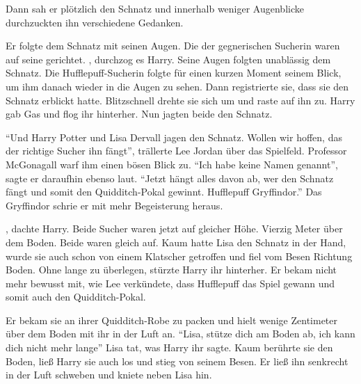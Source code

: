 
Dann sah er plötzlich den Schnatz und innerhalb weniger Augenblicke durchzuckten ihn verschiedene Gedanken. 

Er folgte dem Schnatz mit seinen Augen. Die der gegnerischen Sucherin waren auf seine gerichtet. , durchzog es Harry.  Seine Augen folgten unablässig dem Schnatz. Die Hufflepuff-Sucherin folgte für einen kurzen Moment seinem Blick, um ihm danach wieder in die Augen zu sehen. Dann registrierte sie, dass sie den Schnatz erblickt hatte. Blitzschnell drehte sie sich um und raste auf ihn zu.  Harry gab Gas und flog ihr hinterher. Nun jagten beide den Schnatz.

\enquote{Und Harry Potter und Lisa Dervall jagen den Schnatz. Wollen wir hoffen, das der richtige Sucher ihn fängt}, trällerte Lee Jordan über das Spielfeld. Professor McGonagall warf ihm einen bösen Blick zu. \enquote{Ich habe keine Namen genannt}, sagte er daraufhin ebenso laut. \enquote{Jetzt hängt alles davon ab, wer den Schnatz fängt und somit den Quidditch-Pokal gewinnt. Hufflepuff \gst {} \gst Gryffindor.} Das Gryffindor schrie er mit mehr Begeisterung heraus.

, dachte Harry. Beide Sucher waren jetzt auf gleicher Höhe. Vierzig Meter über dem Boden. Beide waren gleich auf. Kaum hatte Lisa den Schnatz in der Hand, wurde sie auch schon von einem Klatscher getroffen und fiel vom Besen Richtung Boden. Ohne lange zu überlegen, stürzte Harry ihr hinterher. Er bekam nicht mehr bewusst mit, wie Lee verkündete, dass Hufflepuff das Spiel gewann und somit auch den Quidditch-Pokal.

Er bekam sie an ihrer Quidditch-Robe zu packen und hielt wenige Zentimeter über dem Boden mit ihr in der Luft an. \enquote{Lisa, stütze dich am Boden ab, ich kann dich nicht mehr lange\abs} Lisa tat, was Harry ihr sagte. Kaum berührte sie den Boden, ließ Harry sie auch los und stieg von seinem Besen. Er ließ ihn senkrecht in der Luft schweben und kniete neben Lisa hin.

